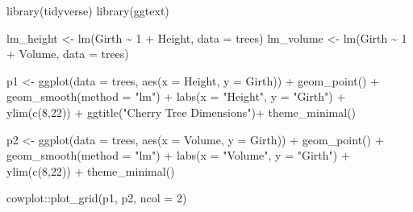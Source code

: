 \documentclass[
  12pt,
]{book}
\newenvironment{Shaded}{\begin{snugshade}}{\end{snugshade}}
\newcommand{\AttributeTok}[1]{\textcolor[rgb]{0.77,0.63,0.00}{#1}}
\newcommand{\DecValTok}[1]{\textcolor[rgb]{0.00,0.00,0.81}{#1}}
\newcommand{\FunctionTok}[1]{\textcolor[rgb]{0.00,0.00,0.00}{#1}}
\newcommand{\NormalTok}[1]{#1}
\newcommand{\OtherTok}[1]{\textcolor[rgb]{0.56,0.35,0.01}{#1}}
\newcommand{\SpecialCharTok}[1]{\textcolor[rgb]{0.00,0.00,0.00}{#1}}
\newcommand{\StringTok}[1]{\textcolor[rgb]{0.31,0.60,0.02}{#1}}
\begin{document}
\begin{Shaded}
\begin{Highlighting}[]
\FunctionTok{library}\NormalTok{(tidyverse)}
\FunctionTok{library}\NormalTok{(ggtext)}

\NormalTok{lm\_height }\OtherTok{\textless{}{-}} \FunctionTok{lm}\NormalTok{(Girth }\SpecialCharTok{\textasciitilde{}} \DecValTok{1} \SpecialCharTok{+}\NormalTok{ Height, }\AttributeTok{data =}\NormalTok{ trees)}
\NormalTok{lm\_volume  }\OtherTok{\textless{}{-}} \FunctionTok{lm}\NormalTok{(Girth }\SpecialCharTok{\textasciitilde{}} \DecValTok{1} \SpecialCharTok{+}\NormalTok{ Volume, }\AttributeTok{data =}\NormalTok{ trees)}

\NormalTok{p1 }\OtherTok{\textless{}{-}} \FunctionTok{ggplot}\NormalTok{(}\AttributeTok{data =}\NormalTok{ trees, }\FunctionTok{aes}\NormalTok{(}\AttributeTok{x =}\NormalTok{ Height, }\AttributeTok{y =}\NormalTok{ Girth)) }\SpecialCharTok{+} 
  \FunctionTok{geom\_point}\NormalTok{() }\SpecialCharTok{+} 
  \FunctionTok{geom\_smooth}\NormalTok{(}\AttributeTok{method =} \StringTok{"lm"}\NormalTok{) }\SpecialCharTok{+}
  \FunctionTok{labs}\NormalTok{(}\AttributeTok{x =} \StringTok{"Height"}\NormalTok{, }\AttributeTok{y =} \StringTok{"Girth"}\NormalTok{) }\SpecialCharTok{+}
  \FunctionTok{ylim}\NormalTok{(}\FunctionTok{c}\NormalTok{(}\DecValTok{8}\NormalTok{,}\DecValTok{22}\NormalTok{)) }\SpecialCharTok{+}
  \FunctionTok{ggtitle}\NormalTok{(}\StringTok{"Cherry Tree Dimensions"}\NormalTok{)}\SpecialCharTok{+}
  \FunctionTok{theme\_minimal}\NormalTok{()}

\NormalTok{p2 }\OtherTok{\textless{}{-}} \FunctionTok{ggplot}\NormalTok{(}\AttributeTok{data =}\NormalTok{ trees, }\FunctionTok{aes}\NormalTok{(}\AttributeTok{x =}\NormalTok{ Volume, }\AttributeTok{y =}\NormalTok{ Girth)) }\SpecialCharTok{+} 
  \FunctionTok{geom\_point}\NormalTok{() }\SpecialCharTok{+} 
  \FunctionTok{geom\_smooth}\NormalTok{(}\AttributeTok{method =} \StringTok{"lm"}\NormalTok{) }\SpecialCharTok{+}
  \FunctionTok{labs}\NormalTok{(}\AttributeTok{x =} \StringTok{"Volume"}\NormalTok{, }\AttributeTok{y =} \StringTok{"Girth"}\NormalTok{) }\SpecialCharTok{+}
  \FunctionTok{ylim}\NormalTok{(}\FunctionTok{c}\NormalTok{(}\DecValTok{8}\NormalTok{,}\DecValTok{22}\NormalTok{)) }\SpecialCharTok{+}
  \FunctionTok{theme\_minimal}\NormalTok{()}

\NormalTok{cowplot}\SpecialCharTok{::}\FunctionTok{plot\_grid}\NormalTok{(p1, p2, }\AttributeTok{ncol =} \DecValTok{2}\NormalTok{)}
\end{Highlighting}
\end{Shaded}
\end{document}
